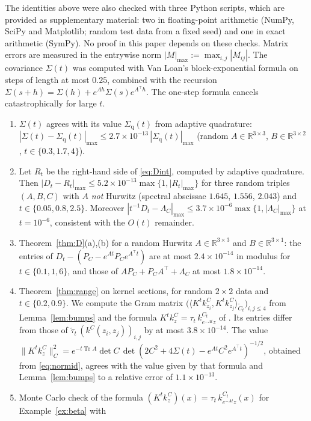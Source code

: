 \documentclass[11pt]{amsart}
\numberwithin{equation}{section}
\theoremstyle{definition}
\theoremstyle{remark}
\newcommand{\R}{\mathbb{R}}
\newcommand{\Tr}{\operatorname{Tr}}
\newcommand{\Ct}{\widetilde{C}_t}
\newcommand{\taut}{\widetilde{\tau}_t}
\newcommand{\ip}[2]{\langle #1,#2\rangle}
\newcommand{\tp}{\top}
\begin{document}
The identities above were also checked with three Python scripts, which are provided as supplementary material:
two in floating-point arithmetic (NumPy, SciPy and Matplotlib; random test data from a fixed seed) and one in exact
arithmetic (SymPy). No proof in this paper depends on these checks. Matrix errors are measured in the entrywise
norm $|M|_{\max}:=\max_{i,j}|M_{ij}|$. The covariance $\Sigma(t)$ was computed with Van Loan's block-exponential
formula \cite{VanLoan} on steps of length at most $0.25$, combined with the recursion
$\Sigma(s+h)=\Sigma(h)+e^{Ah}\Sigma(s)e^{A^\tp h}$. The one-step formula cancels catastrophically for large $t$.
\begin{enumerate}
\item $\Sigma(t)$ agrees with its value $\Sigma_{\mathrm q}(t)$ from adaptive quadrature:
$|\Sigma(t)-\Sigma_{\mathrm q}(t)|_{\max}\le2.7\times10^{-13}\,|\Sigma_{\mathrm q}(t)|_{\max}$ (random $A\in\R^{3\times3}$,
$B\in\R^{3\times2}$, $t\in\{0.3,1.7,4\}$).
\item Let $R_t$ be the right-hand side of \eqref{eq:Dint}, computed by adaptive quadrature. Then
$|D_t-R_t|_{\max}\le5.2\times10^{-13}\max\{1,|R_t|_{\max}\}$ for three random triples $(A,B,C)$ with $A$ \emph{not}
Hurwitz (spectral abscissae $1.645$, $1.556$, $2.043$) and $t\in\{0.05,0.8,2.5\}$. Moreover
$|t^{-1}D_t-\Lambda_C|_{\max}\le3.7\times10^{-6}\max\{1,|\Lambda_C|_{\max}\}$ at $t=10^{-6}$, consistent with the $O(t)$
remainder.
\item Theorem~\ref{thm:D}(a),(b) for a random Hurwitz $A\in\R^{3\times3}$ and $B\in\R^{3\times1}$: the entries of
$D_t-(P_C-e^{At}P_Ce^{A^\tp t})$ are at most $2.4\times10^{-14}$ in modulus for $t\in\{0.1,1,6\}$, and those of
$AP_C+P_CA^\tp+\Lambda_C$ at most $1.8\times10^{-14}$.
\item Theorem~\ref{thm:range} on kernel sections, for random $2\times2$ data and $t\in\{0.2,0.9\}$. We compute the
Gram matrix $\bigl(\ip{K^tk^C_{z_i}}{K^tk^C_{z_j}}_{\Ct}\bigr)_{i,j\le4}$ from Lemma~\ref{lem:bumps} and the formula
$K^tk^C_z=\tau_t\,k^{C_t}_{e^{-At}z}$ of \cite[proof of Proposition~4.1]{PSWPN}. Its entries differ from those of
$\taut\,(k^C(z_i,z_j))_{i,j}$ by at most $3.8\times10^{-14}$. The value
$\|K^tk^C_z\|_C^2=e^{-t\Tr A}\det C\,\det(2C^2+4\Sigma(t)-e^{At}C^2e^{A^\tp t})^{-1/2}$, obtained from
\eqref{eq:normid}, agrees with the value given by that formula and Lemma~\ref{lem:bumps} to a relative error of
$1.1\times10^{-13}$.
\item Monte Carlo check of the formula $(K^tk^C_z)(x)=\tau_t\,k^{C_t}_{e^{-At}z}(x)$ for Example~\ref{ex:beta} with

\end{enumerate}
\end{document}
